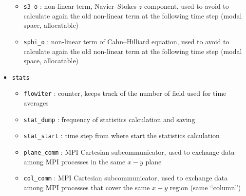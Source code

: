 \begin{itemize}
\begin{itemize}
\item \texttt{s3\_o} : non-linear term, Navier--Stokes $z$ component, used to avoid to calculate again the old non-linear term at the following time step (modal space, allocatable)
\item \texttt{sphi\_o} : non-linear term of Cahn--Hilliard equation, used to avoid to calculate again the old non-linear term at the following time step (modal space, allocatable)
\end{itemize}
\item \texttt{stats}
\begin{itemize}
\item \texttt{flowiter} : counter, keeps track of the number of field used for time averages
\item \texttt{stat\_dump} : frequency of statistics calculation and saving
\item \texttt{stat\_start} : time step from where start the statistics calculation
\item \texttt{plane\_comm} : MPI Cartesian subcommunicator, used to exchange data among MPI processes in the same $x-y$ plane
\item \texttt{col\_comm} : MPI Cartesian subcommunicator, used to exchange data among MPI processes that cover the same $x-y$ region (same ``column'')
\end{itemize}
\end{itemize}


